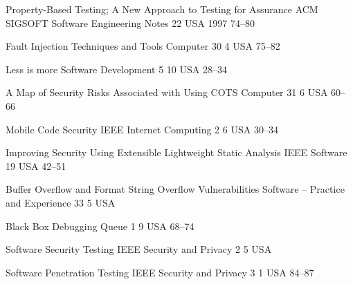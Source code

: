 \begin{thebibliography}{9}
		{
			\BibAnd
			}
		{Property-Based Testing; A New Approach to Testing for Assurance}
		{ACM SIGSOFT Software Engineering Notes}
		{22}
		{}
		{USA}
		{1997}
		{74--80}
	
		{
			\BibAnd
			\BibAnd
			}
		{Fault Injection Techniques and Tools}
		{Computer}
		{30}
		{4}
		{USA}
		{}
		{75--82}
	
		{}
		{Less is more}
		{Software Development}
		{5}
		{10}
		{USA}
		{}
		{28--34}
	
		{
			\BibAnd
			}
		{A Map of Security Risks Associated with Using {COTS}}
		{Computer}
		{31}
		{6}
		{USA}
		{}
		{60--66}
	
		{
			\BibAnd
			}
		{Mobile Code Security}
		{{IEEE} Internet Computing}
		{2}
		{6}
		{USA}
		{}
		{30--34}
	
		{
			\BibAnd
			}
		{Improving Security Using Extensible Lightweight Static Analysis}
		{{IEEE} Software}
		{19}
		{}
		{USA}
		{}
		{42--51}
	
		{
			\BibAnd
			}
		{Buffer Overflow and Format String Overflow Vulnerabilities}
		{Software -- Practice and Experience}
		{33}
		{5}
		{USA}
		{}
		{}
	
		{
			\BibAnd
			}
		{Black Box Debugging}
		{Queue}
		{1}
		{9}
		{USA}
		{}
		{68--74}
	
		{
			\BibAnd
			}
		{Software Security Testing}
		{{IEEE} Security and Privacy}
		{2}
		{5}
		{USA}
		{}
		{}
	
		{
			\BibAnd
			\BibAnd
			}
		{Software Penetration Testing}
		{{IEEE} Security and Privacy}
		{3}
		{1}
		{USA}
		{}
		{84--87}
	

\end{thebibliography}
